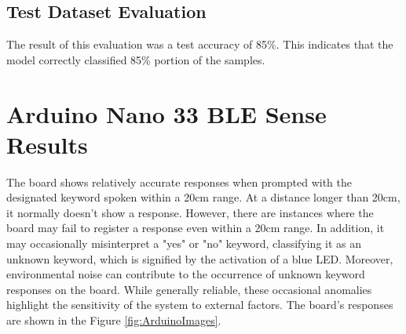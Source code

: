 \subsection{Test Dataset Evaluation}

The result of this evaluation was a test accuracy of 85\%. This indicates that the model correctly classified 85\% portion of the samples.

\section{Arduino Nano 33 BLE Sense Results}

The board shows relatively accurate responses when prompted with the designated keyword spoken within a 20cm range. At a distance longer than 20cm, it normally doesn't show a response. However, there are instances where the board may fail to register a response even within a 20cm range. In addition, it may occasionally misinterpret a "yes" or "no" keyword, classifying it as an unknown keyword, which is signified by the activation of a blue LED. Moreover, environmental noise can contribute to the occurrence of unknown keyword responses on the board. While generally reliable, these occasional anomalies highlight the sensitivity of the system to external factors. The board's responses are shown in the Figure \ref{fig:ArduinoImages}.


